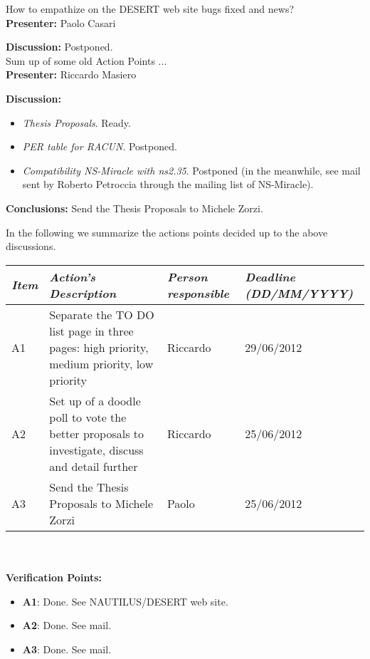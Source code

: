 \documentclass[11pt,journal,draftclsnofoot,onecolumn,twoside,letterpaper]{IEEEtran}
\theoremstyle{definition} \newtheorem{definition}[]{Definition}
\theoremstyle{theorem} \newtheorem{theorem}[]{Theorem}
\begin{document}
 How to empathize on the DESERT web site bugs fixed and news?\\
{\bf Presenter:} Paolo Casari

{\bf Discussion:} Postponed.
\  \\

 Sum up of some old Action Points ...\\
{\bf Presenter:} Riccardo Masiero

{\bf Discussion:}
\begin{itemize}
 \item {\it Thesis Proposals}. Ready. 
 \item {\it PER table for RACUN}. Postponed.
 \item {\it Compatibility NS-Miracle with ns2.35}. Postponed (in the meanwhile, see mail sent by Roberto Petroccia through the mailing list of NS-Miracle).
\end{itemize}

{\bf Conclusions:} Send the Thesis Proposals to Michele Zorzi.
\  \\

\newpage


In the following we summarize the actions points decided up to the above discussions. 

\begin{tabular}{|p{}|p{}|p{}|p{}|}
\hline
{\it Item} & {\it Action's Description} & {\it Person responsible} & {\it Deadline (DD/MM/YYYY)}\\
\hline
A1 & Separate the TO DO list page in three pages: high priority, medium priority, low priority & Riccardo & 29/06/2012\\
A2 & Set up of a doodle poll to vote the better proposals to investigate, discuss and detail further & Riccardo & 25/06/2012\\
A3 & Send the Thesis Proposals to Michele Zorzi & Paolo & 25/06/2012\\
\hline
\end{tabular}
\ \\
\ \\
{\bf Verification Points:}
\begin{itemize}
  \item {\bf A1}: Done. See NAUTILUS/DESERT web site.
  \item {\bf A2}: Done. See mail.
  \item {\bf A3}: Done. See mail.
\end{itemize}
\end{document}
